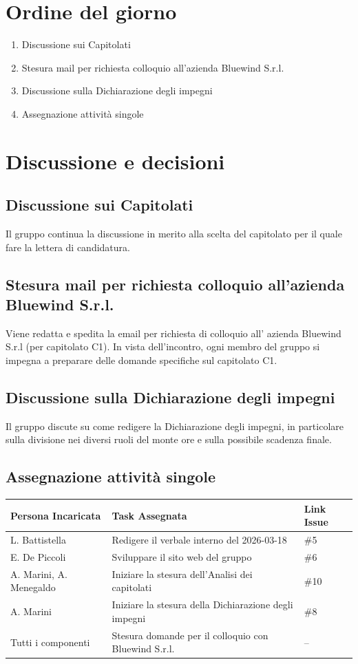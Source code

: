 \documentclass[a4paper, 10pt, colorlinks=true, linkcolor=black, urlcolor=blue, citecolor=blue, hidelinks]{article}
\begin{document}
\section{Ordine del giorno}
\begin{enumerate}
    \item Discussione sui Capitolati
    \item Stesura mail per richiesta colloquio all'azienda Bluewind S.r.l.
    \item Discussione sulla Dichiarazione degli impegni
    \item Assegnazione attività singole
\end{enumerate}

\section{Discussione e decisioni}
\subsection{Discussione sui Capitolati}
Il gruppo continua la discussione in merito alla scelta del capitolato per il quale fare la lettera di candidatura.

\subsection{Stesura mail per richiesta colloquio all'azienda Bluewind S.r.l.}
Viene redatta e spedita la email per richiesta di colloquio all' azienda Bluewind S.r.l (per capitolato C1). In vista dell'incontro, ogni membro del gruppo si impegna a preparare delle domande specifiche sul capitolato C1.

\subsection{Discussione sulla Dichiarazione degli impegni}
Il gruppo discute su come redigere la Dichiarazione degli impegni, in particolare sulla divisione nei diversi ruoli del monte ore e sulla possibile scadenza finale.

\subsection{Assegnazione attività singole}
\begin{center}
\renewcommand{\arraystretch}{1.4}
\begin{tabular}{|p{4.2cm}|p{6.2cm}|p{2.2cm}|}
\hline
\textbf{Persona Incaricata} & \textbf{Task Assegnata} & \centering\textbf{Link Issue} \tabularnewline
\hline
L. Battistella & Redigere il verbale interno del 2026-03-18 & \centering \#5 \tabularnewline
\hline
E. De Piccoli & Sviluppare il sito web del gruppo & \centering  \#6 \tabularnewline
\hline
A. Marini, A. Menegaldo & Iniziare la stesura dell'Analisi dei capitolati & \centering \#10 \tabularnewline
\hline
A. Marini & Iniziare la stesura della Dichiarazione degli impegni & \centering \#8 \tabularnewline
\hline
Tutti i componenti & Stesura domande per il colloquio con Bluewind S.r.l. & \centering -- \tabularnewline
\hline
\end{tabular}
\end{center}


\appendix
\end{document}

